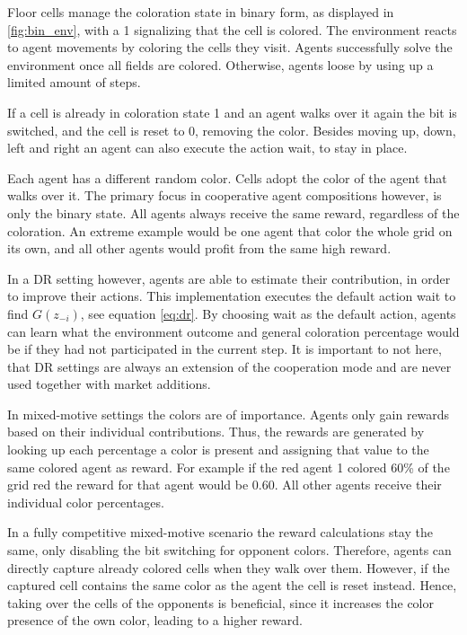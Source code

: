 Floor cells manage the coloration state in binary form, as displayed in \ref{fig:bin_env}, with a 1 signalizing that the cell is colored. The environment reacts to agent movements by coloring the cells they visit. Agents successfully solve the environment once all fields are colored. Otherwise, agents loose by using up a limited amount of steps.

If a cell is already in coloration state 1 and an agent walks over it again the bit is switched, and the cell is reset to 0, removing the color. Besides moving up, down, left and right an agent can also execute the action wait, to stay in place.

Each agent has a different random color. Cells adopt the color of the agent that walks over it. The primary focus in cooperative agent compositions however, is only the binary state. All agents always receive the same reward, regardless of the coloration. An extreme example would be one agent that color the whole grid on its own, and all other agents would profit from the same high reward. 

In a DR setting however, agents are able to estimate their contribution, in order to improve their actions. This implementation executes the default action wait to find $G(z_{-i})$, see equation \eqref{eq:dr}. By choosing wait as the default action, agents can learn what the environment outcome and general coloration percentage would be if they had not participated in the current step. It is important to not here, that DR settings are always an extension of the cooperation mode and are never used together with market additions.

In mixed-motive settings the colors are of importance. Agents only gain rewards based on their individual contributions. Thus, the rewards are generated by looking up each percentage a color is present and assigning that value to the same colored agent as reward. For example if the red agent 1 colored 60\% of the grid red the reward for that agent would be 0.60. All other agents receive their individual color percentages.

In a fully competitive mixed-motive scenario the reward calculations stay the same, only disabling the bit switching for opponent colors. Therefore, agents can directly capture already colored cells when they walk over them. However, if the captured cell contains the same color as the agent the cell is reset instead. Hence, taking over the cells of the opponents is beneficial, since it increases the color presence of the own color, leading to a higher reward.

